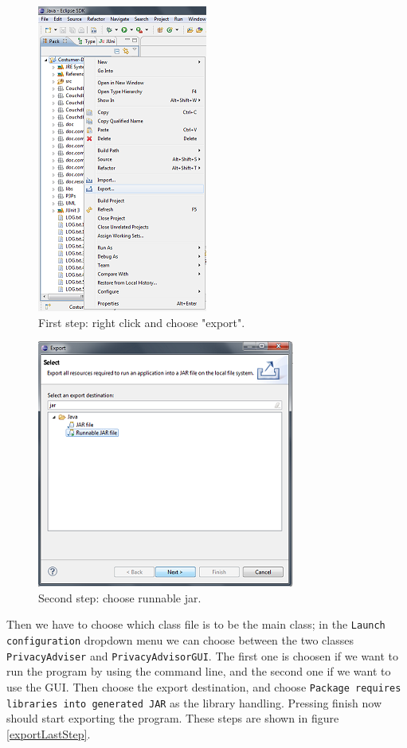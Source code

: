   \begin{figure}
	\begin{centering}
    \includegraphics{Documentation/export.png}
    \caption{First step: right click and choose "export".}
    \label{exportFirstStep}
    \end{centering}
  \end{figure}


  \begin{figure}
  \begin{centering}
    \includegraphics{Documentation/export_jar.png}
    \caption{Second step: choose runnable jar.}
    \label{exportSecondStep}
    \end{centering}
  \end{figure}


Then we have to choose which class file is to be the main class; in the \texttt{Launch configuration} dropdown menu we can choose between the two classes \texttt{PrivacyAdviser} and \texttt{PrivacyAdvisorGUI}. The first one is choosen if we want to run the program by using the command line, and the second one if we want to use the GUI. Then choose the export destination, and choose \texttt{Package requires libraries into generated JAR} as the library handling. Pressing finish now should start exporting the program. These steps are shown in figure \ref{exportLastStep}.


